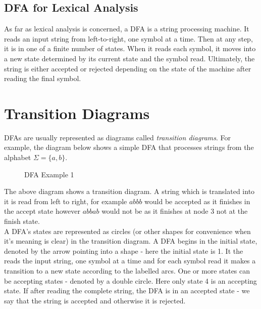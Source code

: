 \subsection{DFA for Lexical Analysis}
As far as lexical analysis is concerned, a DFA is a string processing machine. It reads an input string from left-to-right, one symbol at a time. Then at any step, it is in one of a finite number of states. When it reads each symbol, it moves into a new state determined by its current state and the symbol read. Ultimately, the string is either accepted or rejected depending on the state of the machine after reading the final symbol. 

\section{Transition Diagrams}
DFAs are usually represented as diagrams called \textit{transition diagrams}. For example, the diagram below shows a simple DFA that processes strings from the alphabet $\Sigma = \{a, b\}$.
\begin{figure}[H]
    \centering
    \caption{DFA Example 1}
    \label{fig:dfa-string}
\end{figure}

The above diagram shows a transition diagram. A string which is translated into it is read from left to right, for example $abbb$ would be accepted as it finishes in the accept state however $abbab$ would not be as it finishes at node 3 not at the finish state.\\

A DFA's states are represented as circles (or other shapes for convenience when it's meaning is clear) in the transition diagram. A DFA begins in the initial state, denoted by the arrow pointing into a shape - here the initial state is 1. It the reads the input string, one symbol at a time and for each symbol read it makes a transition to a new state according to the labelled arcs. One or more states can be accepting states - denoted by a double circle. Here only state 4 is an accepting state. If after reading the complete string, the DFA is in an accepted state - we say that the string is accepted and otherwise it is rejected.\\

